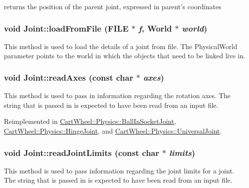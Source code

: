 \label{classCartWheel_1_1Physics_1_1Joint_ac0365213bd8aab8af0db718c87e63fd9}
returns the position of the parent joint, expressed in parent's coordinates \hypertarget{classCartWheel_1_1Physics_1_1Joint_a907c88d9f5136fb1b6d911d9993f243d}{
\subsubsection[{loadFromFile}]{\setlength{\rightskip}{0pt plus 5cm}void Joint::loadFromFile (FILE $\ast$ {\em f}, \/  {\bf World} $\ast$ {\em world})}}
\label{classCartWheel_1_1Physics_1_1Joint_a907c88d9f5136fb1b6d911d9993f243d}
This method is used to load the details of a joint from file. The PhysicalWorld parameter points to the world in which the objects that need to be linked live in. \hypertarget{classCartWheel_1_1Physics_1_1Joint_a30ecfb4d75270a399661552df87c01de}{
\subsubsection[{readAxes}]{\setlength{\rightskip}{0pt plus 5cm}void Joint::readAxes (const char $\ast$ {\em axes})}}
\label{classCartWheel_1_1Physics_1_1Joint_a30ecfb4d75270a399661552df87c01de}
This method is used to pass in information regarding the rotation axes. The string that is passed in is expected to have been read from an input file. 

Reimplemented in \hyperlink{classCartWheel_1_1Physics_1_1BallInSocketJoint_a7d4d2b89877b4bc9afbb9971e2c1bb67}{CartWheel::Physics::BallInSocketJoint}, \hyperlink{classCartWheel_1_1Physics_1_1HingeJoint_a03be2b3b0d8b82d646f2c5b343d19faa}{CartWheel::Physics::HingeJoint}, and \hyperlink{classCartWheel_1_1Physics_1_1UniversalJoint_ac2bbb40eff30cfce3979b0334ce8c88b}{CartWheel::Physics::UniversalJoint}.

\hypertarget{classCartWheel_1_1Physics_1_1Joint_a3a70bb2e447b5acd7997545d3751a423}{
\subsubsection[{readJointLimits}]{\setlength{\rightskip}{0pt plus 5cm}void Joint::readJointLimits (const char $\ast$ {\em limits})}}
\label{classCartWheel_1_1Physics_1_1Joint_a3a70bb2e447b5acd7997545d3751a423}
This method is used to pass information regarding the joint limits for a joint. The string that is passed in is expected to have been read from an input file. 

